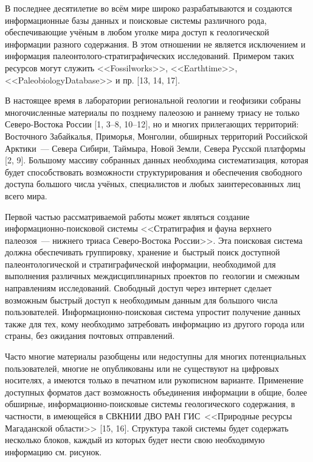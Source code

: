  

\makeProcTitle
{}

В последнее десятилетие во всём мире широко разрабатываются и создаются информационные базы данных и поисковые системы различного рода, обеспечивающие учёным в любом уголке мира доступ к геологической информации разного содержания. В этом отношении не является исключением и информация палеонтолого-стратиграфических исследований. Примером таких ресурсов могут служить <<Fossilworks>>, <<Earthtime>>, <<PaleobiologyDa\-ta\-base>> и пр. [13, 14, 17].

В настоящее время в лаборатории региональной геологии и геофизики собраны многочисленные материалы по позднему палеозою и раннему триасу не только Северо-Востока России [1, 3--8, 10--12], но и многих прилегающих территорий: Восточного Забайкалья, Приморья, Монголии, обширных территорий Российской Арктики~--- Севера Сибири, Таймыра, Новой Земли, Севера Русской платформы [2, 9]. Большому массиву собранных данных необходима систематизация, которая будет способствовать возможности структурирования и обеспечения свободного доступа большого числа учёных, специалистов и любых заинтересованных лиц всего мира.

Первой частью рассматриваемой работы может являться создание информационно-поисковой системы <<Стратиграфия и фауна верхнего палеозоя~--- нижнего триаса Северо-Востока России>>. Эта поисковая система должна обеспечивать группировку, хранение и~быстрый поиск доступной палеонтологической и стратиграфической информации, необходимой для выполнения различных междисциплинарных проектов по~геологии и смежным направлениям исследований. Свободный доступ через интернет сделает возможным быстрый доступ к необходимым данным для большого числа пользователей. Информационно-поисковая система упростит получение данных также для тех, кому необходимо затребовать информацию из другого города или страны, без ожидания почтовых отправлений.

Часто многие материалы разобщены или недоступны для многих потенциальных пользователей, многие не опубликованы или не существуют на цифровых носителях, а имеются только в печатном или рукописном варианте. Применение доступных форматов даст возможность объединения информации в общие, более обширные, информационно-поисковые системы геологического содержания, в частности, в имеющейся в СВКНИИ ДВО РАН ГИС~<<Природные ресурсы Магаданской области>> [15, 16].
Структура такой системы будет содержать несколько блоков, каждый из которых будет нести свою необходимую информацию см. рисунок.

